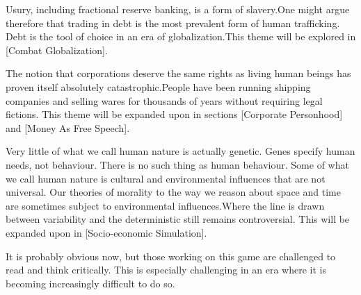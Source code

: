 Usury, including fractional reserve banking, is a form of slavery. One might argue therefore that trading in debt is the most prevalent form of human trafficking. Debt is the tool of choice in an era of globalization.\footnotecite[perkins2005] This theme will be explored in [Combat Globalization].


The notion that corporations deserve the same rights as living human beings has proven itself absolutely catastrophic. People have been running shipping companies and selling wares for thousands of years without requiring legal fictions. This theme will be expanded upon in sections \in{}[Corporate Personhood] and \in{}[Money As Free Speech].


Very little of what we call human nature is actually genetic. Genes specify human needs, not behaviour. There is no such thing as  human behaviour. Some of what we call human nature is cultural and environmental influences that are not universal. Our theories of morality to the way we reason about space and time are sometimes subject to environmental influences.\footnotecite[henrich2010] Where the line is drawn between variability and the deterministic still remains controversial. This will be expanded upon in [Socio-economic Simulation]. 
\stopitemize

It is probably obvious now, but those working on this game are challenged to read and think critically. This is especially challenging in an era where it is becoming increasingly difficult to do so.

\StopChapter

